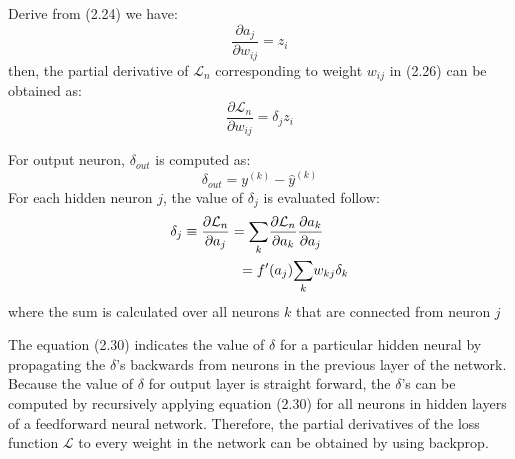 \par
Derive from (2.24) we have:
\begin{equation}
    \frac{\partial a_j}{ \partial w_{ij}} = z_i
\end{equation}
then, the partial derivative of $\mathcal{L}_n$ corresponding to weight $w_{ij}$ in (2.26) can be obtained as:
\begin{equation}
    \frac{\partial \mathcal{L}_n}{ \partial w_{ij}} = \delta_j z_i
\end{equation}
\par For output neuron, $\delta_{out}$ is computed as:
\begin{equation}
    \delta_{out} = y^{(k)} - \hat{y}^{(k)}
\end{equation}
For each hidden neuron $j$, the value of $\delta_j$ is evaluated follow:
\begin{equation}
    \begin{split}
        \delta_j & \equiv \frac{\partial \mathcal{L}_n}{ \partial a_{j}} = \underset{k}{\sum}\frac{\partial \mathcal{L}_n}{ \partial a_{k}}\frac{\partial a_k}{ \partial a_{j}}\\
                        &\hspace{1.4cm} = f'(a_j)\underset{k}{\sum}w_{kj}\delta_k
    \end{split}
\end{equation}
where the sum is calculated over all neurons $k$ that are connected from neuron $j$\par
The equation (2.30) indicates the value of $\delta$ for a particular hidden neural by propagating the $\delta$'s backwards from neurons in the previous layer of the network. Because the value of $\delta$ for output layer is straight forward, the $\delta$'s can be computed by recursively applying equation (2.30) for all neurons in hidden layers of a feedforward neural network. Therefore, the partial derivatives of the loss function $\mathcal{L}$ to every weight in the network can be obtained by using backprop.
